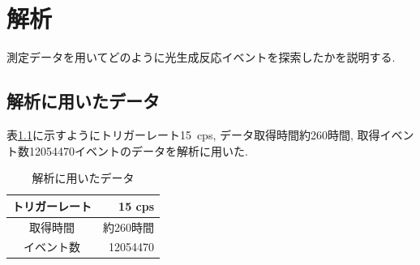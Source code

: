 \chapter{解析}\label{analysis}
測定データを用いてどのように光生成反応イベントを探索したかを説明する.

\section{解析に用いたデータ}\label{sec:anal:data}
表\ref{tab:analyzed_data}に示すようにトリガーレート15\ cps, データ取得時間約260時間, 取得イベント数12054470イベントのデータを解析に用いた.
\begin{table}[H]
    \centering
    \caption{解析に用いたデータ}
    \label{tab:analyzed_data}
    \begin{tabular}{|c|r|}
        \hline
        トリガーレート & 15 cps    \\ \hline
        取得時間       & 約260時間 \\ \hline
        イベント数     & 12054470  \\ \hline
    \end{tabular}
\end{table}


